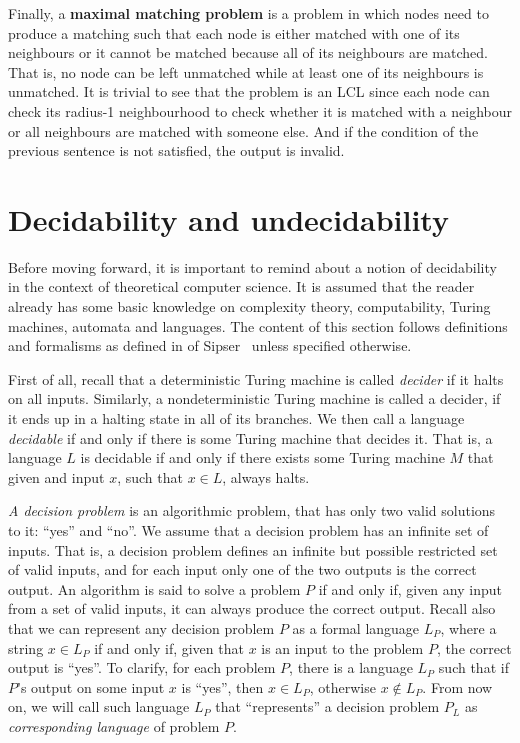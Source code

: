 Finally, a \textbf{maximal matching problem} is a problem in which nodes need to
produce a matching such that each node is either matched with one of 
its neighbours or it cannot be matched because all of its neighbours are
matched. That is, no node can be left unmatched while at least one of its
neighbours is unmatched. It is trivial to see that the problem is an LCL
since each node can check its radius-1 neighbourhood to check whether it
is matched with a neighbour or all neighbours are matched with someone else.
And if the condition of the previous sentence is not satisfied, the output
is invalid.

\section{Decidability and undecidability}

Before moving forward, it is important to remind about a notion of
decidability in the context of theoretical computer science. It is
assumed that the reader already has some basic knowledge on
complexity theory, computability, Turing machines, automata and
languages. The content of this section follows
definitions and formalisms as defined in of Sipser~\cite{Sipser2012}
unless specified otherwise.

First of all, recall that a deterministic Turing machine is called
\emph{decider} if it halts on all inputs. Similarly,
a nondeterministic Turing machine is called a decider, if
it ends up in a halting state in all of its branches. We then
call a language \emph{decidable} if and only if there is some Turing
machine that decides it. That is, a language $L$ is decidable
if and only if there exists some Turing machine $M$ that given
and input $x$, such that $x \in L$, always halts.

\emph{A decision problem} is an algorithmic problem, that has only two
valid solutions to it: ``yes'' and ``no''. We assume that a decision
problem has an infinite set of inputs. That is, a decision problem
defines an infinite but possible restricted set of valid inputs,
and for each input only one of the two outputs is the correct
output. An algorithm is said to solve a problem $P$ if and only
if, given any input from a set of valid inputs, it can
always produce the correct output. Recall also that we can
represent any decision problem $P$ as a formal language $L_P$, where
a string $x \in L_P$ if and only if, given that $x$ is an input
to the problem $P$, the correct output is ``yes''. To clarify,
for each problem $P$, there is a language $L_P$ such that
if $P$'s output on some input $x$ is ``yes'', then $x \in L_P$,
otherwise $x \notin L_P$. From now on, we will call such
language $L_P$ that ``represents'' a decision problem $P_L$ as
\emph{corresponding language} of problem $P$.

